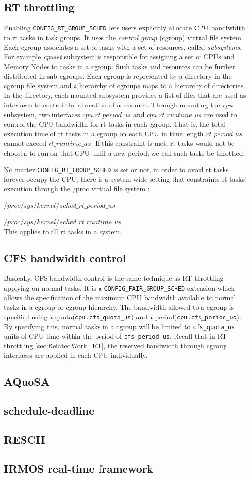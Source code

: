 \subsection{RT throttling\label{sec:RelatedWork_RT}}
Enabling \texttt{CONFIG\_RT\_GROUP\_SCHED} lets users explicitly allocate
CPU bandiwidth to rt tasks in task groups. It uses the \emph{control group}
(cgroup) virtual file system. Each cgroup associates a set of tasks with
a set of resources, called \emph{subsystems}. For example \emph{cpuset} 
subsystem is responsible for assigning a set of CPUs and Memory Nodes to
tasks in a cgroup. Such tasks and resources can be further distributed in 
sub cgroups. Each cgroup is represented by a directory in the cgroup file 
system and a hierarchy of cgroups maps to a hierarchy of directories. In 
the directory, each mounted subsystem provides a list of files that are used 
as interfaces to control the allocation of a resource.
Through mounting the \emph{cpu} subsystem, two interfaces $cpu.rt\_period\_us$ 
and $cpu.rt\_runtime\_us$ are used to control the CPU bandwidth for rt 
tasks in each cgroup. That is, the total execution time of rt tasks in a cgroup 
on each CPU in time length $rt\_period\_us$ cannot exceed $rt\_runtime\_us$. 
If this constraint is met, rt tasks would not be choosen to run on that CPU 
until a new period; we call such tasks be throttled.

No matter \texttt{CONFIG\_RT\_GROUP\_SCHED} is set or not, in order to avoid rt 
tasks forever occupy thc CPU, there is a system wide setting that constraints
rt tasks' execution through the /proc virtual file system :

	$/proc/sys/kernel/sched\_rt\_period\_us$ 

	$/proc/sys/kernel/sched\_rt\_runtime\_us$ 
\\This applies to all rt tasks in a system.

\subsection{CFS bandwidth control\label{RelatedWork_CFS}}
Basically, CFS bandwidth control is the same technique as RT throttling
applying on normal tasks. It is a \texttt{CONFIG\_FAIR\_GROUP\_SCHED} 
extension which allows the specification of the maximum CPU bandwidth
available to normal tasks  in a cgroup or cgroup hierarchy.
The bandwidth allowed to a cgroup is specified using a 
quota(\texttt{cpu.cfs\_quota\_us}) and a period(\texttt{cpu.cfs\_period\_us}).
By specifying this, normal tasks in a cgroup will be limited to 
\texttt{cfs\_quota\_us} units of CPU time within the period of 
\texttt{cfs\_period\_us}. Recall that in RT throttling \ref{sec:RelatedWork_RT},
the reserved bandwidth through cgroup interfaces are applied in each CPU
individually.
\subsection{AQuoSA}
\subsection{schedule-deadline}
\subsection{RESCH}
\subsection{IRMOS real-time framework}
